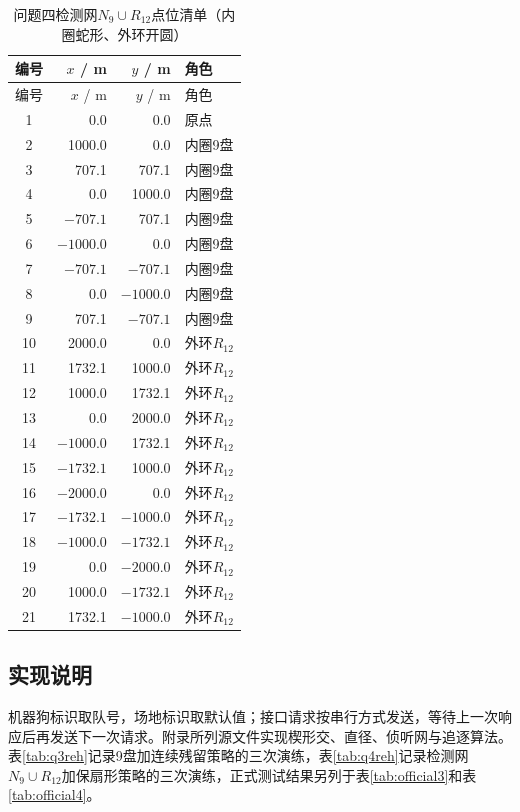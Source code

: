 \documentclass{cumcmthesis}
\begin{document}
{\scriptsize
\begin{longtable}{crrl}
\caption{问题四检测网$N_9\cup R_{12}$点位清单（内圈蛇形、外环开圆）}
\label{tab:q4visit}\\
\toprule
编号 & $x$ / m & $y$ / m & 角色 \\
\midrule
\endfirsthead
\toprule
编号 & $x$ / m & $y$ / m & 角色 \\
\midrule
\endhead
1 & 0.0 & 0.0 & 原点 \\
2 & 1000.0 & 0.0 & 内圈9盘 \\
3 & 707.1 & 707.1 & 内圈9盘 \\
4 & 0.0 & 1000.0 & 内圈9盘 \\
5 & $-707.1$ & 707.1 & 内圈9盘 \\
6 & $-1000.0$ & 0.0 & 内圈9盘 \\
7 & $-707.1$ & $-707.1$ & 内圈9盘 \\
8 & 0.0 & $-1000.0$ & 内圈9盘 \\
9 & 707.1 & $-707.1$ & 内圈9盘 \\
10 & 2000.0 & 0.0 & 外环$R_{12}$ \\
11 & 1732.1 & 1000.0 & 外环$R_{12}$ \\
12 & 1000.0 & 1732.1 & 外环$R_{12}$ \\
13 & 0.0 & 2000.0 & 外环$R_{12}$ \\
14 & $-1000.0$ & 1732.1 & 外环$R_{12}$ \\
15 & $-1732.1$ & 1000.0 & 外环$R_{12}$ \\
16 & $-2000.0$ & 0.0 & 外环$R_{12}$ \\
17 & $-1732.1$ & $-1000.0$ & 外环$R_{12}$ \\
18 & $-1000.0$ & $-1732.1$ & 外环$R_{12}$ \\
19 & 0.0 & $-2000.0$ & 外环$R_{12}$ \\
20 & 1000.0 & $-1732.1$ & 外环$R_{12}$ \\
21 & 1732.1 & $-1000.0$ & 外环$R_{12}$ \\
\bottomrule
\end{longtable}
}

\subsection{实现说明}

机器狗标识取队号，场地标识取默认值；接口请求按串行方式发送，等待上一次响应后再发送下一次请求。附录所列源文件实现楔形交、直径、侦听网与追逐算法。表\ref{tab:q3reh}记录9盘加连续残留策略的三次演练，表\ref{tab:q4reh}记录检测网$N_9\cup R_{12}$加保扇形策略的三次演练，正式测试结果另列于表\ref{tab:official3}和表\ref{tab:official4}。
\end{document}
